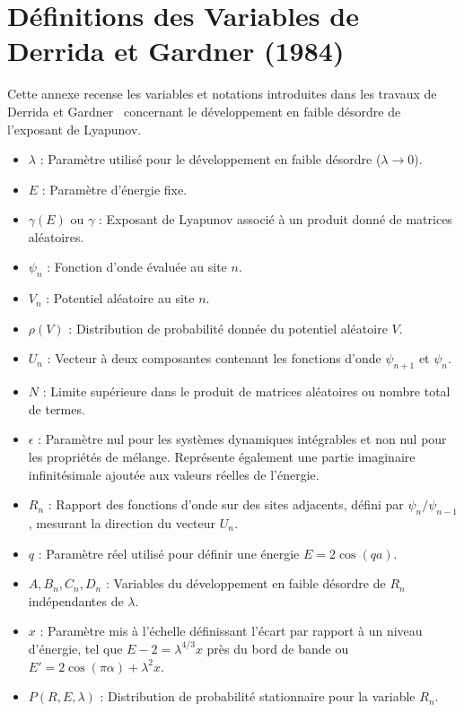 \chapter{Définitions des Variables de Derrida et Gardner (1984)}\label{annexe:variables}

Cette annexe recense les variables et notations introduites dans les travaux de Derrida et Gardner~\cite{Derrida1984} concernant le développement en faible désordre de l'exposant de Lyapunov.

\begin{itemize}
    \item $\lambda$ : Paramètre utilisé pour le développement en faible désordre ($\lambda \rightarrow 0$).
    \item $E$ : Paramètre d'énergie fixe.
    \item $\gamma(E)$ ou $\gamma$ : Exposant de Lyapunov associé à un produit donné de matrices aléatoires.
    \item $\psi_n$ : Fonction d'onde évaluée au site $n$.
    \item $V_n$ : Potentiel aléatoire au site $n$.
    \item $\rho(V)$ : Distribution de probabilité donnée du potentiel aléatoire $V$.
    \item $U_n$ : Vecteur à deux composantes contenant les fonctions d'onde $\psi_{n+1}$ et $\psi_n$.
    \item $N$ : Limite supérieure dans le produit de matrices aléatoires ou nombre total de termes.
    \item $\epsilon$ : Paramètre nul pour les systèmes dynamiques intégrables et non nul pour les propriétés de mélange. Représente également une partie imaginaire infinitésimale ajoutée aux valeurs réelles de l'énergie.
    \item $R_n$ : Rapport des fonctions d'onde sur des sites adjacents, défini par $\psi_n / \psi_{n-1}$, mesurant la direction du vecteur $U_n$.
    \item $q$ : Paramètre réel utilisé pour définir une énergie $E = 2 \cos(qa)$.
    \item $A, B_n, C_n, D_n$ : Variables du développement en faible désordre de $R_n$ indépendantes de $\lambda$.
    \item $x$ : Paramètre mis à l'échelle définissant l'écart par rapport à un niveau d'énergie, tel que $E-2 = \lambda^{4/3}x$ près du bord de bande ou $E' = 2 \cos(\pi\alpha) + \lambda^2 x$.
    \item $P(R, E, \lambda)$ : Distribution de probabilité stationnaire pour la variable $R_n$.

\end{itemize}
